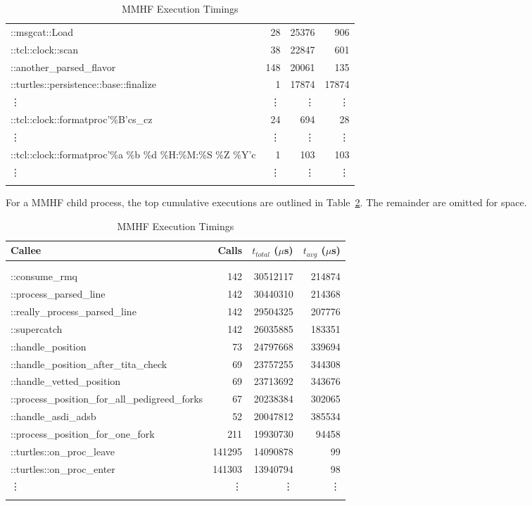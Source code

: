 \documentclass{article}[letter,10pt]
\begin{document}
{{{{\begin{longtable}{l r r r}
          ::msgcat::Load & 28 & 25376 & 906 \\
          ::tcl::clock::scan & 38 & 22847 & 601 \\
          ::another\_parsed\_flavor & 148 & 20061 & 135 \\
          ::turtles::persistence::base::finalize & 1 & 17874 & 17874 \\
          \vdots & \vdots & \vdots & \vdots \\
          ::tcl::clock::formatproc'\%B'cs\_cz & 24 & 694 & 28 \\
          \vdots & \vdots & \vdots & \vdots \\
          ::tcl::clock::formatproc'\%a \%b \%d \%H:\%M:\%S \%Z \%Y'c & 1 & 103 & 103 \\
          \vdots & \vdots & \vdots & \vdots \\
          \bottomrule
          \caption{MMHF Execution Timings}
          \label{tbl:mmhftp}
      \end{longtable}}
      For a MMHF child process, the top cumulative executions are outlined in Table~\ref{tbl:mmhftc}. The remainder are omitted for space.
      {\footnotesize
        \begin{longtable}{l r r r}
          \toprule
          Callee & Calls & $t_{total}$ ($\mu$s) & $t_{avg}$ ($\mu$s) \\
          \midrule \\
          \endhead \\
          ::consume\_rmq & 142 & 30512117 & 214874 \\
          ::process\_parsed\_line & 142 & 30440310 & 214368 \\
          ::really\_process\_parsed\_line & 142 & 29504325 & 207776 \\
          ::supercatch & 142 & 26035885 & 183351 \\
          ::handle\_position & 73 & 24797668 & 339694 \\
          ::handle\_position\_after\_tita\_check & 69 & 23757255 & 344308 \\
          ::handle\_vetted\_position & 69 & 23713692 & 343676 \\
          ::process\_position\_for\_all\_pedigreed\_forks & 67 & 20238384 & 302065 \\
          ::handle\_asdi\_adsb & 52 & 20047812 & 385534 \\
          ::process\_position\_for\_one\_fork & 211 & 19930730 & 94458 \\
          ::turtles::on\_proc\_leave & 141295 & 14090878 & 99 \\
          ::turtles::on\_proc\_enter & 141303 & 13940794 & 98 \\
          \vdots & \vdots & \vdots & \vdots \\
          \bottomrule
          \caption{MMHF Execution Timings}
          \label{tbl:mmhftc}
      \end{longtable}}

}}}
\end{document}
